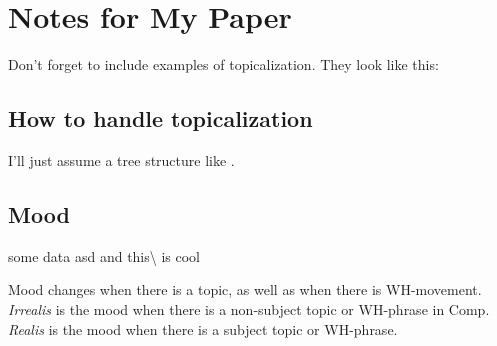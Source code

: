 \documentclass[12pt]{article}
\begin{document}
\section*{Notes for My Paper}

Don't forget to include examples of topicalization.
They look like this:

\subsection*{How to handle topicalization}

I'll just assume a tree structure like .

\subsection*{Mood}

some data asd  and this{\textbackslash} is cool

Mood changes when there is a topic, as well as when
there is WH-movement.  \emph{Irrealis} is the mood when
there is a non-subject topic or WH-phrase in Comp.
\emph{Realis} is the mood when there is a subject topic
or WH-phrase.
\end{document}
